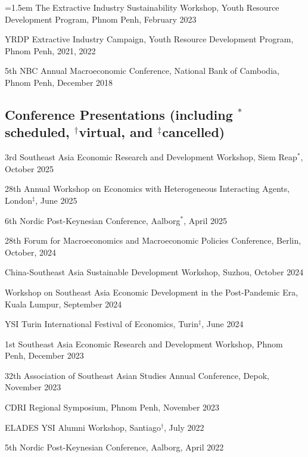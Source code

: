 \documentclass[10pt,a4paper]{article}
\begin{document}
\hangindent=1.5em
The Extractive Industry Sustainability Workshop, Youth Resource Development Program, Phnom Penh, February 2023

YRDP Extractive Industry Campaign, Youth Resource Development Program, Phnom Penh, 2021, 2022

5th NBC Annual Macroeconomic Conference, National Bank of Cambodia, Phnom Penh, December 2018


\subsection*{Conference Presentations (including $^\ast$scheduled, $^\dag$virtual, and $^\ddag$cancelled)}

3rd Southeast Asia Economic Research and Development Workshop, Siem Reap$^\ast$, October 2025

28th Annual Workshop on Economics with Heterogeneous Interacting Agents, London$^\ddag$, June 2025

6th Nordic Post-Keynesian Conference, Aalborg$^\ast$, April 2025

28th Forum for Macroeconomics and Macroeconomic Policies Conference, Berlin, October, 2024

China-Southeast Asia Sustainable Development Workshop, Suzhou, October 2024

Workshop on Southeast Asia Economic Development in the Post-Pandemic Era, Kuala Lumpur, September 2024

YSI Turin International Festival of Economics, Turin$^\ddag$, June 2024

1st Southeast Asia Economic Research and Development Workshop, Phnom Penh, December 2023

32th Association of Southeast Asian Studies Annual Conference, Depok, November 2023

CDRI Regional Symposium, Phnom Penh, November 2023

ELADES YSI Alumni Workshop, Santiago$^\dag$, July 2022

5th Nordic Post-Keynesian Conference, Aalborg, April 2022

\end{document}
